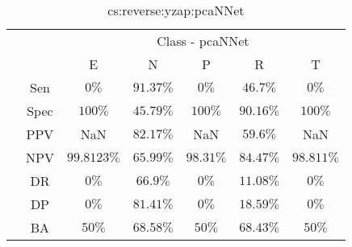 \begin{table}[!ht]
	\centering
	\begin{tabular}{|c|c|c|c|c|c|c|}
		\cline{3-7}
		\multicolumn{2}{c|}{} & \multicolumn{5}{c|}{Class - pcaNNet} \\ \cline{3-7}
		\multicolumn{2}{c|}{} & E & N & P & R & T \\ \hline
		\multirow{7}{*}{\rotatebox{90}{Statistics}} & Sen & $0\%$ & $91.37\%$ & $0\%$ & $46.7\%$ & $0\%$ \\ \cline{2-7}
		 & Spec & $100\%$ & $45.79\%$ & $100\%$ & $90.16\%$ & $100\%$ \\ \cline{2-7}
		 & PPV & NaN & $82.17\%$ & NaN & $59.6\%$ & NaN \\ \cline{2-7}
		 & NPV & $99.8123\%$ & $65.99\%$ & $98.31\%$ & $84.47\%$ & $98.811\%$ \\ \cline{2-7}
		 & DR & $0\%$ & $66.9\%$ & $0\%$ & $11.08\%$ & $0\%$ \\ \cline{2-7}
		 & DP & $0\%$ & $81.41\%$ & $0\%$ & $18.59\%$ & $0\%$ \\ \cline{2-7}
		 & BA & $50\%$ & $68.58\%$ & $50\%$ & $68.43\%$ & $50\%$ \\ \hline
	\end{tabular}
	\caption{cs:reverse:yzap:pcaNNet}
	\label{tab:cs:reverse:yzap:pcaNNet}
\end{table}
